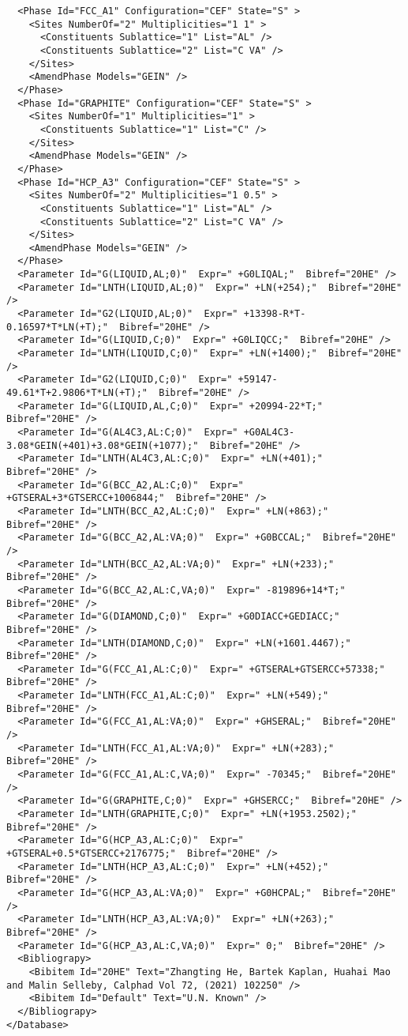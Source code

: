 \documentclass{article}
\begin{document}
\begin{appendices}
{\begin{verbatim}
  <Phase Id="FCC_A1" Configuration="CEF" State="S" >
    <Sites NumberOf="2" Multiplicities="1 1" >
      <Constituents Sublattice="1" List="AL" />
      <Constituents Sublattice="2" List="C VA" />
    </Sites>
    <AmendPhase Models="GEIN" />
  </Phase>
  <Phase Id="GRAPHITE" Configuration="CEF" State="S" >
    <Sites NumberOf="1" Multiplicities="1" >
      <Constituents Sublattice="1" List="C" />
    </Sites>
    <AmendPhase Models="GEIN" />
  </Phase>
  <Phase Id="HCP_A3" Configuration="CEF" State="S" >
    <Sites NumberOf="2" Multiplicities="1 0.5" >
      <Constituents Sublattice="1" List="AL" />
      <Constituents Sublattice="2" List="C VA" />
    </Sites>
    <AmendPhase Models="GEIN" />
  </Phase>
  <Parameter Id="G(LIQUID,AL;0)"  Expr=" +G0LIQAL;"  Bibref="20HE" />
  <Parameter Id="LNTH(LIQUID,AL;0)"  Expr=" +LN(+254);"  Bibref="20HE" />
  <Parameter Id="G2(LIQUID,AL;0)"  Expr=" +13398-R*T-0.16597*T*LN(+T);"  Bibref="20HE" />
  <Parameter Id="G(LIQUID,C;0)"  Expr=" +G0LIQCC;"  Bibref="20HE" />
  <Parameter Id="LNTH(LIQUID,C;0)"  Expr=" +LN(+1400);"  Bibref="20HE" />
  <Parameter Id="G2(LIQUID,C;0)"  Expr=" +59147-49.61*T+2.9806*T*LN(+T);"  Bibref="20HE" />
  <Parameter Id="G(LIQUID,AL,C;0)"  Expr=" +20994-22*T;"  Bibref="20HE" />
  <Parameter Id="G(AL4C3,AL:C;0)"  Expr=" +G0AL4C3-3.08*GEIN(+401)+3.08*GEIN(+1077);"  Bibref="20HE" />
  <Parameter Id="LNTH(AL4C3,AL:C;0)"  Expr=" +LN(+401);"  Bibref="20HE" />
  <Parameter Id="G(BCC_A2,AL:C;0)"  Expr=" +GTSERAL+3*GTSERCC+1006844;"  Bibref="20HE" />
  <Parameter Id="LNTH(BCC_A2,AL:C;0)"  Expr=" +LN(+863);"  Bibref="20HE" />
  <Parameter Id="G(BCC_A2,AL:VA;0)"  Expr=" +G0BCCAL;"  Bibref="20HE" />
  <Parameter Id="LNTH(BCC_A2,AL:VA;0)"  Expr=" +LN(+233);"  Bibref="20HE" />
  <Parameter Id="G(BCC_A2,AL:C,VA;0)"  Expr=" -819896+14*T;"  Bibref="20HE" />
  <Parameter Id="G(DIAMOND,C;0)"  Expr=" +G0DIACC+GEDIACC;"  Bibref="20HE" />
  <Parameter Id="LNTH(DIAMOND,C;0)"  Expr=" +LN(+1601.4467);"  Bibref="20HE" />
  <Parameter Id="G(FCC_A1,AL:C;0)"  Expr=" +GTSERAL+GTSERCC+57338;"  Bibref="20HE" />
  <Parameter Id="LNTH(FCC_A1,AL:C;0)"  Expr=" +LN(+549);"  Bibref="20HE" />
  <Parameter Id="G(FCC_A1,AL:VA;0)"  Expr=" +GHSERAL;"  Bibref="20HE" />
  <Parameter Id="LNTH(FCC_A1,AL:VA;0)"  Expr=" +LN(+283);"  Bibref="20HE" />
  <Parameter Id="G(FCC_A1,AL:C,VA;0)"  Expr=" -70345;"  Bibref="20HE" />
  <Parameter Id="G(GRAPHITE,C;0)"  Expr=" +GHSERCC;"  Bibref="20HE" />
  <Parameter Id="LNTH(GRAPHITE,C;0)"  Expr=" +LN(+1953.2502);"  Bibref="20HE" />
  <Parameter Id="G(HCP_A3,AL:C;0)"  Expr=" +GTSERAL+0.5*GTSERCC+2176775;"  Bibref="20HE" />
  <Parameter Id="LNTH(HCP_A3,AL:C;0)"  Expr=" +LN(+452);"  Bibref="20HE" />
  <Parameter Id="G(HCP_A3,AL:VA;0)"  Expr=" +G0HCPAL;"  Bibref="20HE" />
  <Parameter Id="LNTH(HCP_A3,AL:VA;0)"  Expr=" +LN(+263);"  Bibref="20HE" />
  <Parameter Id="G(HCP_A3,AL:C,VA;0)"  Expr=" 0;"  Bibref="20HE" />
  <Bibliograpy>
    <Bibitem Id="20HE" Text="Zhangting He, Bartek Kaplan, Huahai Mao and Malin Selleby, Calphad Vol 72, (2021) 102250" /> 
    <Bibitem Id="Default" Text="U.N. Known" /> 
  </Bibliograpy>
</Database>
\end{verbatim}
}


\end{appendices}
\end{document}
